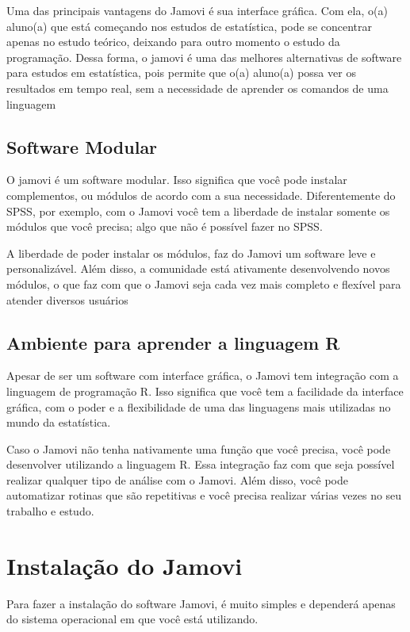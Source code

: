 Uma das principais vantagens do Jamovi é sua interface gráfica. Com ela, o(a) aluno(a) que está começando nos estudos de estatística, pode se concentrar apenas no estudo teórico, deixando para outro momento o estudo da programação. Dessa forma, o jamovi é uma das melhores alternativas de software para estudos em estatística, pois permite que o(a) aluno(a) possa ver os resultados em tempo real, sem a necessidade de aprender os comandos de uma linguagem

\subsection{Software Modular}

O jamovi é um software modular. Isso significa que você pode instalar complementos, ou módulos de acordo com a sua necessidade. Diferentemente do SPSS, por exemplo, com o Jamovi você tem a liberdade de instalar somente os módulos que você precisa; algo que não é possível fazer no SPSS.

A liberdade de poder instalar os módulos, faz do Jamovi um software leve e personalizável. Além disso, a comunidade está ativamente desenvolvendo novos módulos, o que faz com que o Jamovi seja cada vez mais completo e flexível para atender diversos usuários

\subsection{Ambiente para aprender a linguagem R}

Apesar de ser um software com interface gráfica, o Jamovi tem integração com a linguagem de programação R. Isso significa que você tem a facilidade da interface gráfica, com o poder e a flexibilidade de uma das linguagens mais utilizadas no mundo da estatística.

Caso o Jamovi não tenha nativamente uma função que você precisa, você pode desenvolver utilizando a linguagem R. Essa integração faz com que seja possível realizar qualquer tipo de análise com o Jamovi. Além disso, você pode automatizar rotinas que são repetitivas e você precisa realizar várias vezes no seu trabalho e estudo.

\section{Instalação do Jamovi}

Para fazer a instalação do software Jamovi, é muito simples e dependerá apenas do sistema operacional em que você está utilizando.

